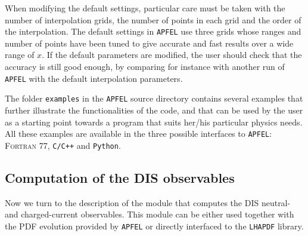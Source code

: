 \documentclass[11pt,a4paper]{article}
\begin{document}
When modifying the default settings, particular care 
must be taken with the number of interpolation grids, the number
of points in each grid and the order of the interpolation.
%
The  default
settings in {\tt APFEL} use three grids whose ranges and
number of points have been tuned to give accurate and
fast results over a wide range of $x$.
%
If the default parameters are modified, the user should check
that the accuracy is still good enough, by comparing for instance
with another run of {\tt APFEL} with the default interpolation
parameters.

The folder {\tt examples} in the {\tt APFEL} source directory contains
several examples that further illustrate the functionalities of
the code, and that can be used by the user as a starting point
towards a program that suits her/his particular physics needs.
%
All these examples are available in the three possible interfaces to
{\tt APFEL}: {\scshape Fortran 77}, {\tt C/C++} and {\tt Python}.


\subsection{Computation of the DIS observables}

Now we turn to the description of the module that computes the DIS
neutral- and charged-current observables. 
%
This module can be either used together with the PDF
evolution provided by {\tt APFEL} or directly interfaced to the
 {\tt LHAPDF} library.
\end{document}
